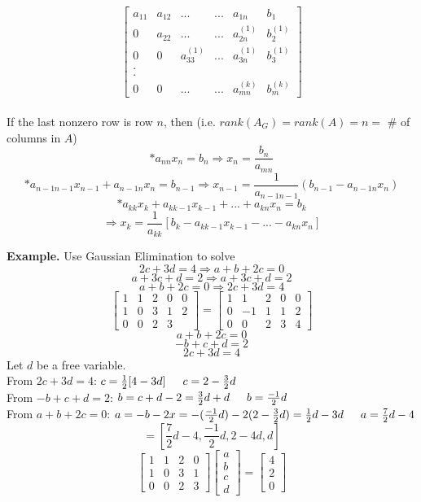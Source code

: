 \documentclass [12pt]{article}
\begin{document}
\begin{framed}
$$\begin{bmatrix}
a_{11}&a_{12}&...&...&a_{1n}&b_1\\
0&a_{22}&...&...&a_{2n}^{(1)}&b_2^{(1)}\\
0&0&a_{33}^{(1)}&...&a_{3n}^{(1)}&b_3^{(1)}\\
.\\
.\\
0&0&...&...&a_{mn}^{(k)}&b_m^{(k)}
\end{bmatrix}$$\\
If the last nonzero row is row $n$, then (i.e. $rank(A_G)=rank(A)=n=$ \# of columns in $A$)
\[*a_{nn}x_n=b_n\Rightarrow x_n=\frac{b_n}{a_{mn}}\]
\[*a_{n-1n-1}x_{n-1}+a_{n-1n}x_{n}=b_{n-1}\Rightarrow x_{n-1} = \frac{1}{a_{n-1n-1}}(b_{n-1}-a_{n-1n}x_{n})\]
\[*a_{kk}x_k+a_{kk-1}x_{k-1}+...+a_{kn}x_{n}=b_k\]
\[\Rightarrow x_k=\frac{1}{a_{kk}}[b_k-a_{kk-1}x_{k-1}-...-a_{kn}x_n]\]
\end{framed}
\noindent\textbf{Example. } Use Gaussian Elimination to solve \\
\[2c+3d=4 \Rightarrow  a+b+2c=0\]
\[a+3c+d=2 \Rightarrow a+3c+d=2\]
\[a+b+2c=0 \Rightarrow 2c+3d=4\]
$$\begin{bmatrix}
1&1&2&0&0\\
1&0&3&1&2\\
0&0&2&3
\end{bmatrix} = \begin{bmatrix}
1&1&2&0&0\\
0&-1&1&1&2\\
0&0&2&3&4
\end{bmatrix}$$
\[a+b+2c=0\]
\[-b+c+d=2\]
\[2c+3d=4\]
Let $d$ be a free variable.\\
From $2c+3d=4$: $c=\frac{1}{2}[4-3d]\indent c=2-\frac{3}{2}d$\\
From $-b+c+d=2$: $b=c+d-2=\frac{3}{2}d+d\indent b=\frac{-1}{2}d$\\
From $a+b+2c=0$: $a=-b-2x=-(\frac{-1}{2}d)-2(2-\frac{3}{2}d)=\frac{1}{2}d-3d\indent a=\frac{7}{2}d-4$
\[=[\frac{7}{2}d-4,\frac{-1}{2}d,2-4d,d]\]
$$\begin{bmatrix}
1&1&2&0\\
1&0&3&1\\
0&0&2&3
\end{bmatrix}\begin{bmatrix}
a\\
b\\
c\\
d
\end{bmatrix}=\begin{bmatrix}
4\\
2\\
0
\end{bmatrix}$$\\
\end{document}
